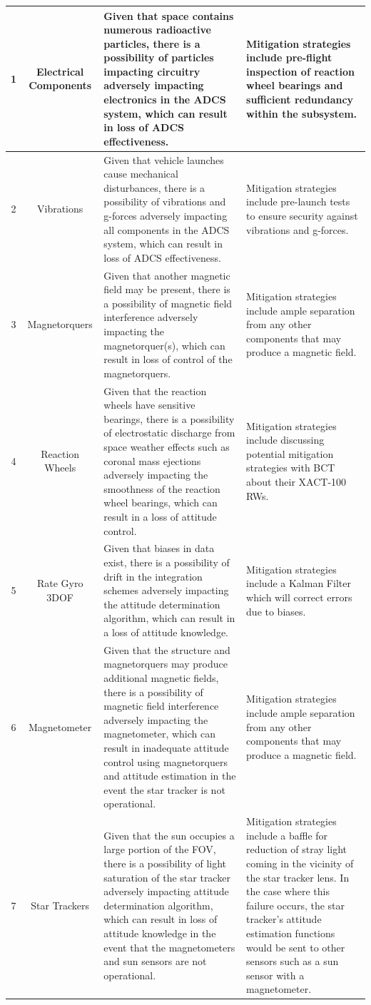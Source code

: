 \documentclass[conf]{new-aiaa}
\begin{document}
\begin{center}
\begin{longtable}[c]{|c|c|p{4.0cm}<{\centering}|p{4.0cm}<{\centering}|}
1  & Electrical Components & Given that space contains numerous radioactive particles, there is a possibility of particles impacting circuitry adversely impacting electronics in the ADCS system, which can result in loss of ADCS effectiveness. & Mitigation strategies include pre-flight inspection of reaction wheel bearings and sufficient redundancy within the subsystem. \\ \hline 
\rowcolor{lightgray} 2  &  Vibrations & Given that vehicle launches cause mechanical disturbances, there is a possibility of vibrations and g-forces adversely impacting all components in the ADCS system, which can result in loss of ADCS effectiveness. & Mitigation strategies include pre-launch tests to ensure security against vibrations and g-forces. \\ \hline 
3  &  Magnetorquers & Given that another magnetic field may be present, there is a possibility of magnetic field interference adversely impacting the magnetorquer(s), which can result in loss of control of the magnetorquers. & Mitigation strategies include ample separation from any other components that may produce a magnetic field. \\ \hline 
\rowcolor{lightgray} 4  &  Reaction Wheels & Given that the reaction wheels have sensitive bearings, there is a possibility of electrostatic discharge from space weather effects such as coronal mass ejections adversely impacting the smoothness of the reaction wheel bearings, which can result in a loss of attitude control. & Mitigation strategies include discussing potential mitigation strategies with BCT about their XACT-100 RWs. \\ \hline 
5  &  Rate Gyro 3DOF & Given that biases in data exist, there is a possibility of drift in the integration schemes adversely impacting the attitude determination algorithm, which can result in a loss of attitude knowledge. & Mitigation strategies include a Kalman Filter which will correct errors due to biases. \\ \hline 
\rowcolor{lightgray} 6  &  Magnetometer & Given that the structure and magnetorquers may produce additional magnetic fields, there is a possibility of magnetic field interference adversely impacting the magnetometer, which can result in inadequate attitude control using magnetorquers and attitude estimation in the event the star tracker is not operational. & Mitigation strategies include ample separation from any other components that may produce a magnetic field. \\ \hline 
7  &  Star Trackers & Given that the sun occupies a large portion of the FOV, there is a possibility of light saturation of the star tracker adversely impacting attitude determination algorithm, which can result in loss of attitude knowledge in the event that the magnetometers and sun sensors are not operational. & Mitigation strategies include a baffle for reduction of stray light coming in the vicinity of the star tracker lens. In the case where this failure occurs, the star tracker’s attitude estimation functions would be sent to other sensors such as a sun sensor with a magnetometer. \\ \hline 

\end{longtable}
\end{center}
\end{document}
